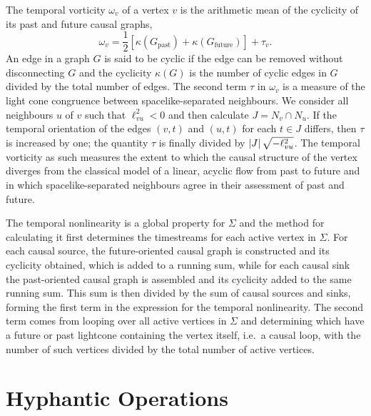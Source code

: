 \documentclass[12pt,letterpaper]{report}
\begin{document}
The temporal vorticity $\omega_v$ of a vertex $v$ is the arithmetic mean of the cyclicity of its past 
and future causal graphs,
\begin{equation*}
\omega_v = \frac {1}{2} \left[\kappa(G_{\text{past}}) + \kappa(G_{\text{future}})\right] + \tau_v.   
\end{equation*}
An edge in a graph $G$ is said to be cyclic if the edge can be removed without disconnecting $G$ and 
the cyclicity $\kappa(G)$ is the number of cyclic edges in $G$ divided by the total number of 
edges. The second term $\tau$ in $\omega_v$ is a measure of the light cone congruence between 
spacelike-separated neighbours. We consider all neighbours $u$ of $v$ such that $\ell_{vu}^2 < 0$ and 
then calculate $J = N_v \cap N_u$. If the temporal orientation of the edges $(v,t)$ and $(u,t)$ for 
each $t\in J$ differs, then $\tau$ is increased by one; the quantity $\tau$ is finally divided 
by $\left\lvert J\right\rvert \sqrt{-\ell_{vu}^2}$. The temporal vorticity as such measures the extent to which the causal 
structure of the vertex diverges from the classical model of a linear, acyclic flow from past to future 
and in which spacelike-separated neighbours agree in their assessment of past and future.   

The temporal nonlinearity is a global property for $\Sigma$ and the method for calculating it first determines 
the timestreams for each active vertex in $\Sigma$. For each causal source, the future-oriented causal graph 
is constructed and its cyclicity obtained, which is added to a running sum, while for each causal sink the 
past-oriented causal graph is assembled and its cyclicity added to the same running sum. This sum is then 
divided by the sum of causal sources and sinks, forming the first term in the expression for the temporal 
nonlinearity. The second term comes from looping over all active vertices in $\Sigma$ and determining which have 
a future or past lightcone containing the vertex itself, i.e.\ a causal loop, with the number of such vertices 
divided by the total number of active vertices. 

\chapter{Hyphantic Operations}
\end{document}

